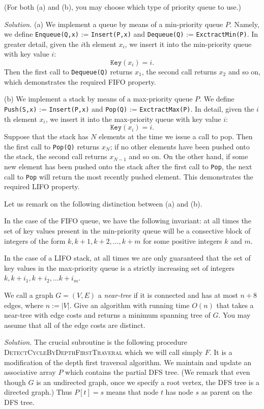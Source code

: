 \documentclass[10pt,reqno]{amsart}
\begin{document}
\begin{outline}[enumerate]
(For both (a) and (b), you may choose which type of priority queue to use.)

\medskip
\noindent \emph{Solution.} (a) We implement a queue by means of a min-priority
queue $P$.  Namely, we define \texttt{Enqueue(Q,x)} := \texttt{Insert(P,x)} and
\texttt{Dequeue(Q)} := \texttt{ExctractMin(P)}. In greater detail, given the
$i$th element $x_i$, we insert it into the min-priority queue with key value
$i$: $$\mathtt{Key}(x_i) = i.$$ Then the first call to \texttt{Dequeue(Q)}
returns $x_1$, the second call returns $x_2$ and so on, which demonstrates the
required FIFO property.

\medskip
(b) We implement a stack by means of a max-priority queue $P$.  We define
\texttt{Push(S,x)} := \texttt{Insert(P,x)} and \texttt{Pop(Q)} :=
\texttt{ExctractMax(P)}. In detail, given the $i$th element $x_i$, we insert it
into the max-priority queue with key value $i$: $$\mathtt{Key}(x_i) = i.$$
Suppose that the stack has $N$ elements at the time we issue a call to pop.
Then the first call to \texttt{Pop(Q)} returns $x_N$; if no other elements have
been pushed onto the stack, the second call returns $x_{N-1}$ and so on. On the
other hand, if some new element has been pushed onto the stack after the first
call to \texttt{Pop}, the next call to \texttt{Pop} will return the most
recently pushed element. This demonstrates the required LIFO property.

\medskip
Let us remark on the following distinction between (a) and (b).

\medskip
In the case of the FIFO queue, we have the following invariant: at all times
the set of key values present in the min-priority queue will be a consective
block of integers of the form $k, k+1, k+2,\dots,k+m$ for some positive
integers $k$ and $m$.

\medskip
In the case of a LIFO stack, at all times we are only guaranteed that the set
of key values in the max-priority queue is a strictly increasing set of
integers $k, k+i_1, k+i_2, \dots k + i_m$.

\newpage{}
\1 We call a graph $G=(V,E)$ a \emph{near-tree} if it is connected and has at
most $n+8$ edges, where $n := |V|$. Give an algorithm with running time $O(n)$
that takes a near-tree with edge costs and returns a minimum spanning tree of
$G$. You may assume that all of the edge costs are distinct.

\medskip

\noindent \emph{Solution.} The crucial subroutine is the following procedure
\textsc{DetectCycleByDepthFirstTraveral} which we will call simply $F$. It is a
modification of the depth first traversal algorithm. We maintain and update an
associative array $P$ which contains the partial DFS tree. (We remark that even
though $G$ is an undirected graph, once we specify a root vertex, the DFS tree
is a directed graph.) Thus $P[t] = s$ means that node $t$ has node $s$ as
parent on the DFS tree.


\end{outline}
\end{document}
